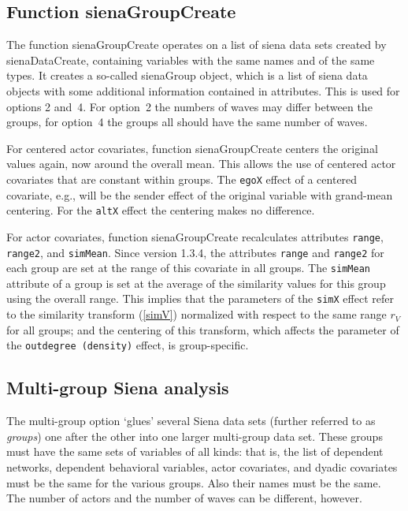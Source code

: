 \documentclass[a4paper,fleqn,11pt]{article}
\newcommand{\+}{\, + \,}
\newcommand{\sfn}[1]{\textsf{#1}}
\begin{document}
\subsection{Function \textsf{sienaGroupCreate}  }
\label{S_multigroup}

The function \textsf{sienaGroupCreate} operates on a list
of \sfn{siena} data sets created by \sfn{sienaDataCreate},
containing variables with the same names and of the same types.
It creates a so-called \sfn{sienaGroup} object, which is a list of
\sfn{siena} data objects with some additional information
contained in attributes.
This is used for options 2 and~4.
For option~2 the numbers of waves may differ between the groups,
for option~4 the groups all should have the same number of waves.

For centered actor covariates, function \textsf{sienaGroupCreate}
centers the original values again, now around the overall mean.
This allows the use of centered actor covariates that are
constant within groups.
The \texttt{egoX} effect of a centered covariate,
e.g., will be the sender effect of the original variable
with grand-mean centering. For the \texttt{altX} effect the centering
makes no difference.

For actor covariates, function \textsf{sienaGroupCreate} recalculates
attributes \texttt{range}, \texttt{range2}, and \texttt{simMean}.
Since version 1.3.4,
the attributes \texttt{range} and \texttt{range2} for each group are set
at the range of this covariate in all groups.
The \texttt{simMean} attribute
of a group is set at the average of the similarity values
for this group using the overall range.
This implies that the parameters of the \texttt{simX} effect refer
to the similarity transform (\ref{simV})
normalized with respect to the same range
$r_V$ for all groups; and the centering of this transform,
which affects the parameter of the \texttt{outdegree (density)} effect,
is group-specific.

\subsection{Multi-group Siena analysis}
\label{S_multigroup}

The multi-group option `glues' several Siena data sets
(further referred to as \emph{groups}) one after the other
into one larger multi-group data set.
These groups must have the same sets of variables of all kinds:
that is, the list of dependent networks, dependent behavioral variables,
actor covariates, and dyadic covariates must be the same
for the various groups.
Also their names must be the same.
The number of actors and the number of waves can be different, however.
\end{document}
